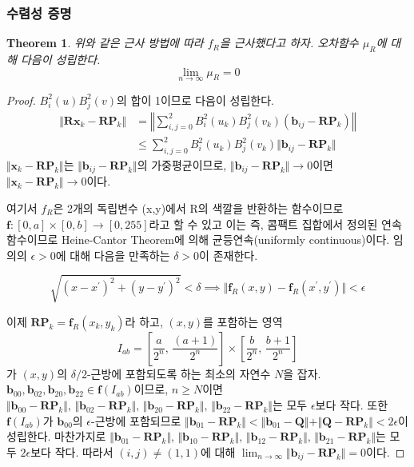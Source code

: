 \documentclass{gshs_thesis}
\theoremstyle{theorem}
\newtheorem{theorem}{Theorem}[section]
\theoremstyle{lemma}
\theoremstyle{definition}
\begin{document}
\subsubsection{수렴성 증명}
\begin{theorem} \label{thm1}
	위와 같은 근사 방법에 따라 $f_{R}$을 근사했다고 하자. 오차함수 $\mu_{R}$에 대해 다음이 성립한다.
	\begin{equation*}
		\lim_{n\to\infty}\mu_{R}=0
	\end{equation*}
\end{theorem} 
\begin{proof}
	$B_i^2(u) B_j^2(v)$의 합이 1이므로 다음이 성립한다.
	\begin{align*}
		\Vert \mathbf{Rx}_k - \mathbf{RP}_k \Vert &= \left\Vert \sum_{i, j = 0}^2 B_i^2(u_k) B_j^2(v_k) (\mathbf{b}_{ij} - \mathbf{RP}_k) \right\Vert \\
		&\leq \sum_{i, j = 0}^2 B_i^2(u_k) B_j^2(v_k) \Vert \mathbf{b}_{ij} - \mathbf{RP}_k \Vert 
	\end{align*}
	$\Vert \mathbf{x}_k - \mathbf{RP}_k \Vert$는 $\Vert \mathbf{b}_{ij} - \mathbf{RP}_k \Vert$의 가중평균이므로, $\Vert \mathbf{b}_{ij} - \mathbf{RP}_k \Vert \to 0$이면 $\Vert \mathbf{x}_k - \mathbf{RP}_k \Vert \to 0$이다. 
	
	 여기서 $f_{R}$은 2개의 독립변수 (x,y)에서 R의 색깔을 반환하는 함수이므로 $\mathbf{f} \colon [0, a] \times [0, b] \to [0,255]$라고 할 수 있고 이는 즉, 콤팩트 집합에서 정의된 연속함수이므로 Heine-Cantor Theorem에 의해 균등연속(uniformly continuous)이다. 임의의 $\epsilon > 0$에 대해 다음을 만족하는 $\delta > 0$이 존재한다. 

	$$ \sqrt{(x - x^\prime)^2 + (y - y^\prime)^2} < \delta \implies \Vert \mathbf{f}_{R}(x,y) - \mathbf{f}_{R}(x^\prime,y^\prime) \Vert < \epsilon $$
	
	이제 $\mathbf{RP}_k = \mathbf{f}_{R}(x_{k},y_{k})$라 하고, $(x,y)$를 포함하는 영역 $$ I_{ab} = \left[ \frac{a}{2^n}, \, \frac{(a+1)}{2^n}\right] \times \left[\frac{b}{2^n}, \,\frac{b+1}{2^n} \right] $$가 $(x,y)$의 $\delta/2$-근방에 포함되도록 하는 최소의 자연수 $N$을 잡자. $\mathbf{b}_{00}, \mathbf{b}_{02}, \mathbf{b}_{20}, \mathbf{b}_{22} \in \mathbf{f}(I_{ab})$이므로, $n \geq N$이면 $\Vert \mathbf{b}_{00} - \mathbf{RP}_k \Vert, \, \Vert \mathbf{b}_{02} - \mathbf{RP}_k \Vert, \, \Vert \mathbf{b}_{20} - \mathbf{RP}_k \Vert, \, \Vert \mathbf{b}_{22} - \mathbf{RP}_k \Vert$는 모두 $\epsilon$보다 작다. 또한 $\mathbf{f}(I_{ab})$가 $\mathbf{b}_{00}$의 $\epsilon$-근방에 포함되므로 $\Vert \mathbf{b}_{01} - \mathbf{RP}_k \Vert < \Vert \mathbf{b}_{01} - \mathbf{Q} \Vert + \Vert \mathbf{Q} - \mathbf{RP}_k \Vert < 2\epsilon$이 성립한다. 마찬가지로 $\Vert \mathbf{b}_{01} - \mathbf{RP}_k \Vert, \, \Vert \mathbf{b}_{10} - \mathbf{RP}_k \Vert, \, \Vert \mathbf{b}_{12} - \mathbf{RP}_k \Vert, \, \Vert \mathbf{b}_{21} - \mathbf{RP}_k \Vert$는 모두 $2\epsilon$보다 작다. 따라서 $(i, j) \neq (1, 1)$에 대해 $\lim_{n \to \infty} \Vert \mathbf{b}_{ij} - \mathbf{RP}_k \Vert = 0$이다. 
	

\end{proof}
\end{document}
